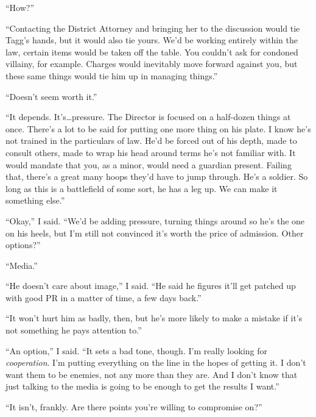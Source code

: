 ``How?''



``Contacting the District Attorney and bringing her to the discussion would tie Tagg's hands, but it would also tie yours.  We'd be working entirely within the law, certain items would be taken off the table.  You couldn't ask for condoned villainy, for example.  Charges would inevitably move forward against you, but these same things would tie him up in managing things.''



``Doesn't seem worth it.''



``It depends.  It's\ldots pressure.  The Director is focused on a half-dozen things at once.  There's a lot to be said for putting one more thing on his plate.  I know he's not trained in the particulars of law.  He'd be forced out of his depth, made to consult others, made to wrap his head around terms he's not familiar with.  It would mandate that you, as a minor, would need a guardian present.  Failing that, there's a great many hoops they'd have to jump through.  He's a soldier.  So long as this is a battlefield of some sort, he has a leg up.  We can make it something else.''



``Okay,'' I said.  ``We'd be adding pressure, turning things around so he's the one on his heels, but I'm still not convinced it's worth the price of admission.  Other options?''



``Media.''



``He doesn't care about image,'' I said.  ``He said he figures it'll get patched up with good PR in a matter of time, a few days back.''



``It won't hurt him as badly, then, but he's more likely to make a mistake if it's not something he pays attention to.''



``An option,'' I said.  ``It sets a bad tone, though.  I'm really looking for \emph{cooperation}.  I'm putting everything on the line in the hopes of getting it.  I don't want them to be enemies, not any more than they are.  And I don't know that just talking to the media is going to be enough to get the results I want.''



``It isn't, frankly.  Are there points you're willing to compromise on?''




